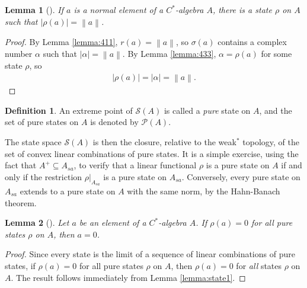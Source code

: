 \documentclass[11pt,a4paper]{report}
\theoremstyle{plain}
\newtheorem{lemma}{Lemma}
\theoremstyle{definition}
\newtheorem{defn}{Definition}
\newcommand{\1}{\mathbbm{1}}
\renewcommand{\S}{\mathscr{S}}
\renewcommand{\P}[1]{\mathscr{P}(#1)}
\newcommand{\spec}[1]{\sigma(#1)}
\begin{document}
\begin{lemma}[{\cite[4.3.4,(iv)]{kadison83}}]\label{lemma:state2}
	If $a$ is a normal element of a $C^\ast$-algebra $A$, there is a state $\rho$ on $A$ such 
	that $|\rho(a)|=\left\|a\right\|$.
\end{lemma}
\begin{proof}
	By Lemma \ref{lemma:411}, $r(a)=\left\|a\right\|$, so $\spec a$ contains a complex number $\alpha$ such that $|\alpha|=\left\|a\right\|$. By Lemma \ref{lemma:433}, $\alpha=\rho(a)$ for some state $\rho$, so 
	\begin{align*}
		|\rho(a)|=|\alpha|=\left\|a\right\|.
	\end{align*}
\end{proof}

\begin{defn}
	An extreme point of $\S(A)$ is called a \emph{pure} state on $A$, and the set of pure 
	states on $A$ is denoted by $\P{A}$.
\end{defn}
The state space $\S(A)$ is then the closure, relative to the weak$^\ast$ 
topology, of the set of convex linear combinations of pure states. 
It is a simple exercise, using the fact that $A^+\subseteq A_{sa}$, to verify 
that a linear functional $\rho$ is a pure state on $A$ if and only if the 
restriction $\rho|_{A_{sa}}$ is a pure state on $A_{sa}$.
Conversely, every pure state on $A_{sa}$ extends to a pure state on $A$ with the 
same norm, by the Hahn-Banach theorem.
 

\begin{lemma}[{\cite[4.3.8,(i)]{kadison83}}]\label{lemma:pure1}
	Let $a$ be an element of a $C^\ast$-algebra $A$. If $\rho(a)=0$ for all \emph{pure} states $\rho$ on 
	$A$, then $a=0$.
\end{lemma}
\begin{proof}
	Since every state is the limit of a sequence of linear combinations of pure states, if $\rho(a)=0$ 
	for all pure states $\rho$ on $A$, then $\rho(a)=0$ for \emph{all} states $\rho$ on $A$. The result 
	follows immediately from Lemma \ref{lemma:state1}.
\end{proof}
\end{document}

